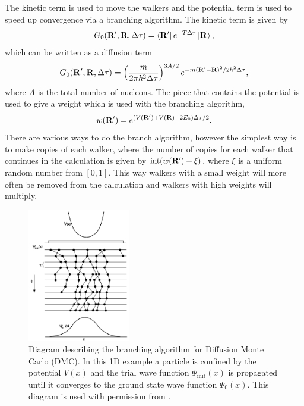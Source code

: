 The kinetic term is used to move the walkers and the potential term is used to speed up convergence via a branching algorithm. The kinetic term is given by
\begin{equation}
   G_0(\mathbf{R}',\mathbf{R},\Delta \tau) = \left< \mathbf{R}' \right|e^{-T\Delta \tau}\left| \mathbf{R} \right>,
\end{equation}
which can be written as a diffusion term
\begin{equation}
   G_0(\mathbf{R}',\mathbf{R},\Delta \tau) = \left(\frac{m}{2\pi\hbar^2\Delta\tau}\right)^{3A/2}e^{-m(\mathbf{R}'-\mathbf{R})^2/2\hbar^2\Delta\tau},
\end{equation}
where $A$ is the total number of nucleons.
The piece that contains the potential is used to give a weight which is used with the branching algorithm,
\begin{equation}
   w(\mathbf{R}') = e^{(V(\mathbf{R}')+V(\mathbf{R})-2E_0)\Delta\tau/2}.
   \label{equ:branchweight}
\end{equation}
There are various ways to do the branch algorithm, however the simplest way is to make copies of each walker, where the number of copies for each walker that continues in the calculation is given by $\mathrm{int}(w(\mathbf{R}')+\xi)$, where $\xi$ is a uniform random number from $[0,1]$. This way walkers with a small weight will more often be removed from the calculation and walkers with high weights will multiply.
\begin{figure}[h!]
   \centering
   \includegraphics[width=0.4\textwidth]{figures/branching.png}
   \caption{Diagram describing the branching algorithm for Diffusion Monte Carlo (DMC). In this 1D example a particle is confined by the potential $V(x)$ and the trial wave function $\Psi_\text{init}(x)$ is propagated until it converges to the ground state wave function $\Psi_0(x)$. This diagram is used with permission from \cite{foulkes2001}.}
   \label{fig:branching}
\end{figure}

